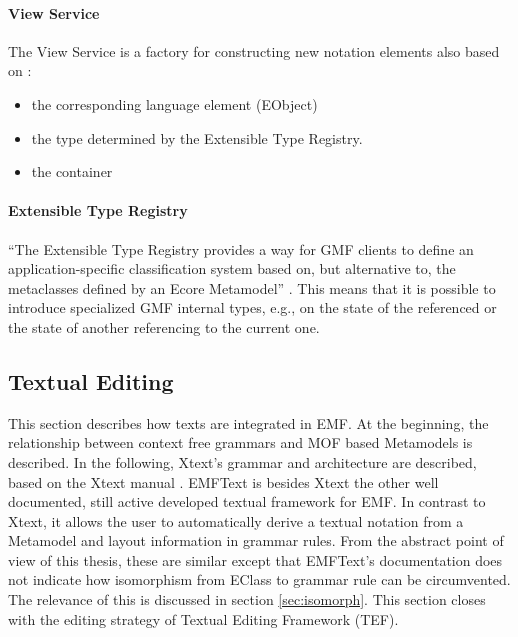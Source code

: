 \paragraph{View Service}
The View Service is a factory for constructing new notation  elements also based on \cite{GMFDoc}:
\begin{itemize}
	\item the corresponding language element (EObject)
	\item the type determined by the Extensible Type Registry.
	\item the container   
\end{itemize}

\paragraph{Extensible Type Registry}
``The Extensible Type Registry provides a way for GMF clients to define an application-specific classification system based on, but alternative to, the metaclasses defined by an Ecore Metamodel'' \cite{GMFDoc}. This means that it is possible to introduce specialized GMF internal types, e.g., on the state of the referenced  or the state of another  referencing to the current one.










 

\subsection{Textual Editing}
This section describes how texts are integrated in EMF. At the beginning, the relationship between context free grammars and MOF based Metamodels is described. In the following, Xtext's grammar and architecture are described, based on the Xtext manual \cite{XTextMan}. EMFText \cite{EMFTextMan} is besides Xtext the other well documented, still active developed textual framework for EMF. In contrast to Xtext, it allows the user to automatically derive a textual notation from a Metamodel and layout information in grammar rules. From the abstract point of view of this thesis, these are similar except that EMFText's documentation does not indicate how isomorphism from EClass to grammar rule can be circumvented. The relevance of this is discussed in section \ref{sec:isomorph}. This section closes with the editing strategy of Textual Editing Framework (TEF).


